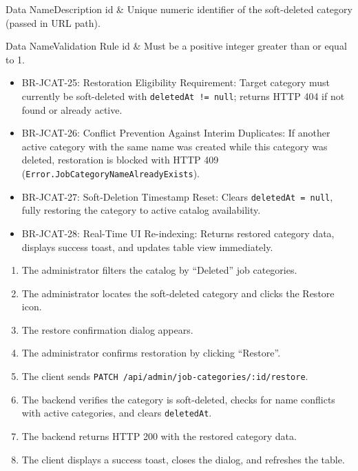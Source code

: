 
\begin{specdatatable}{Data Name}{Description}
id & Unique numeric identifier of the soft-deleted category (passed in URL path).\\ \hline
\end{specdatatable}

\begin{specdatatable}{Data Name}{Validation Rule}
id & Must be a positive integer greater than or equal to 1.\\ \hline
\end{specdatatable}

\begin{itemize}[leftmargin=1.6em,topsep=3pt,itemsep=2pt,parsep=0pt,label=$\bullet$]\brrulelist
    \item BR-JCAT-25: Restoration Eligibility Requirement: Target category must currently be soft-deleted with \texttt{deletedAt != null}; returns HTTP 404 if not found or already active.
    \item BR-JCAT-26: Conflict Prevention Against Interim Duplicates: If another active category with the same name was created while this category was deleted, restoration is blocked with HTTP 409 (\texttt{Error.JobCategoryNameAlreadyExists}).
    \item BR-JCAT-27: Soft-Deletion Timestamp Reset: Clears \texttt{deletedAt = null}, fully restoring the category to active catalog availability.
    \item BR-JCAT-28: Real-Time UI Re-indexing: Returns restored category data, displays success toast, and updates table view immediately.
\end{itemize}

\begin{enumerate}[leftmargin=1.6em,topsep=3pt,itemsep=2pt,parsep=0pt]
    \item The administrator filters the catalog by ``Deleted'' job categories.
    \item The administrator locates the soft-deleted category and clicks the Restore icon.
    \item The restore confirmation dialog appears.
    \item The administrator confirms restoration by clicking ``Restore''.
    \item The client sends \texttt{PATCH /api/admin/job-categories/:id/restore}.
    \item The backend verifies the category is soft-deleted, checks for name conflicts with active categories, and clears \texttt{deletedAt}.
    \item The backend returns HTTP 200 with the restored category data.
    \item The client displays a success toast, closes the dialog, and refreshes the table.
\end{enumerate}

